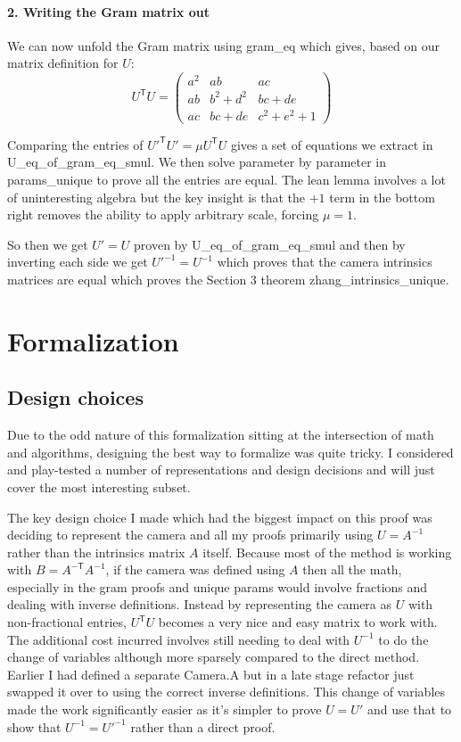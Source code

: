 \documentclass[10pt]{article}
\theoremstyle{plain}
\theoremstyle{definition}
\theoremstyle{remark}
\newcommand{\T}{^{\mathsf{T}}}
\newcommand{\lean}[1]{{\ttfamily\let\us\_\def\_{\us\allowbreak}#1}}
\begin{document}
\paragraph{2. Writing the Gram matrix out}

We can now unfold the Gram matrix using \lean{gram\_eq} which gives, based on our matrix definition for $U$:
\[
U\T U=\begin{pmatrix} a^2 & ab & ac \\ ab & b^2+d^2 & bc+de \\ ac & bc+de & c^2+e^2+1 \end{pmatrix}
\]

Comparing the entries of ${U'}\T U'=\mu U\T U$ gives a set of equations we extract in \lean{U\_eq\_of\_gram\_eq\_smul}. We then solve parameter by parameter in \lean{params\_unique} to prove all the entries are equal. The lean lemma involves a lot of uninteresting algebra but the key insight is that the $+1$ term in the bottom right removes the ability to apply arbitrary scale, forcing $\mu=1$.

So then we get $U'=U$ proven by \lean{U\_eq\_of\_gram\_eq\_smul} and then by inverting each side we get $U'^{-1}=U^{-1}$ which proves that the camera intrinsics matrices are equal which proves the Section 3 theorem \lean{zhang\_intrinsics\_unique}.

\section{Formalization}

\subsection{Design choices}

Due to the odd nature of this formalization sitting at the intersection of math and algorithms, designing the best way to formalize was quite tricky. I considered and play-tested a number of representations and design decisions and will just cover the most interesting subset.

The key design choice I made which had the biggest impact on this proof was deciding to represent the camera and all my proofs primarily using $U=A^{-1}$ rather than the intrinsics matrix $A$ itself. Because most of the method is working with $B=A^{-\mathsf{T}}A^{-1}$, if the camera was defined using $A$ then all the math, especially in the gram proofs and unique params would involve fractions and dealing with inverse definitions. Instead by representing the camera as $U$ with non-fractional entries, $U\T U$ becomes a very nice and easy matrix to work with. The additional cost incurred involves still needing to deal with $U^{-1}$ to do the change of variables although more sparsely compared to the direct method. Earlier I had defined a separate \lean{Camera.A} but in a late stage refactor just swapped it over to using the correct inverse definitions. This change of variables made the work significantly easier as it's simpler to prove $U=U'$ and use that to show that $U^{-1}=U'^{-1}$ rather than a direct proof.
\end{document}
